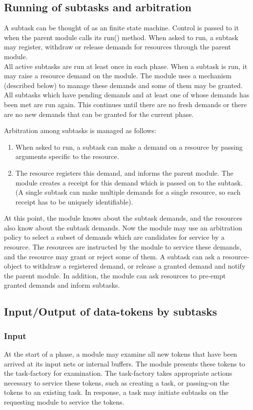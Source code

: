 \documentclass[12pt,a4paper]{report}
\begin{document}
	 
\subsection{Running of subtasks and arbitration}
	A subtask can be thought of as an finite state machine. 
	Control is passed to it	when the parent module calls its run() method. 
	When asked to run, a subtask may register, withdraw or release demands 
	for resources through the parent module. \\

	All active subtasks are run at least once in each phase.
	When a subtask is run, it may raise a resource demand on the
	module.  The module uses a mechanism (described below) to 
	manage these demands and some of them may be granted.
	All subtasks which have pending demands and at least
	one of whose demands has been met are run again.  This
	continues until there are no fresh demands or there are
	no new demands that can be granted for the current phase.
	
	Arbitration among subtasks is managed as follows:
	\begin{enumerate}
		\item When asked to run, a subtask can make a demand on a resource 
			by passing arguments specific to the resource.
		\item The resource registers this demand, and informs the parent 
			module. The module creates a receipt for this demand 
			which is passed on to the subtask.
			(A single subtask can make multiple demands for a single resource, so
			each receipt has to be uniquely identifiable).
	\end{enumerate}
	At this point, the module knows about the subtask demands, and the
	resources also know about the subtask demands.
	Now the module may use an arbitration policy to select a subset
	of demands which are candidates for service by a resource.  The
	resources are instructed by the module to service these demands,
	and the resource may grant or reject some of them. 
	A subtask can ask a resource-object to withdraw a 
	registered demand, or release a granted demand
	and notify the parent module. 
	In addition, the module can ask resources to pre-empt  
	granted demands and inform subtasks.

\subsection{Input/Output of data-tokens by subtasks}
	\subsubsection{Input}
	At the start of a phase, a module may examine all new tokens that
	have been arrived at its input nets or internal buffers. The module
	presents these tokens to the task-factory for examination. The 
	task-factory takes appropriate actions necessary to service these tokens,
	such as creating a task, or passing-on the tokens to an existing task.
	In response, a task may initiate subtasks on the requesting module to 
	service the tokens.
\end{document}
